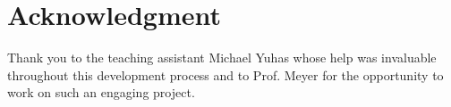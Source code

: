 
%





\section*{Acknowledgment}

Thank you to the teaching assistant Michael Yuhas whose help was invaluable throughout this development process and to Prof. Meyer for the opportunity to work on such an engaging project.





%








